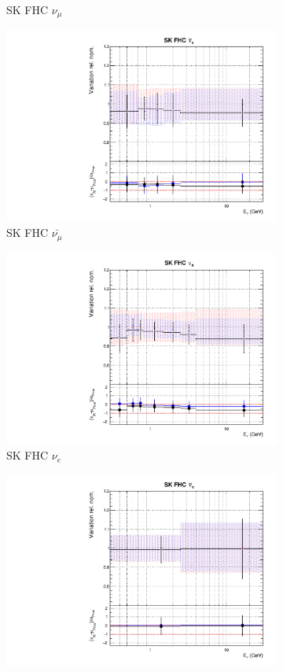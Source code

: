 \begin{figure}[t]
\begin{subfigure}{0.45\textwidth}
  \caption{SK FHC $\nu_{\mu}$}
\end{subfigure}
\begin{subfigure}{0.45\textwidth}
  \centering
  \includegraphics[width=0.75\linewidth]{figs/rhcmpasmvflux9}
  \caption{SK FHC $\bar{\nu_{\mu}}$}
\end{subfigure}
\begin{subfigure}{0.45\textwidth}
  \centering
  \includegraphics[width=0.75\linewidth]{figs/rhcmpasmvflux10}
  \caption{SK FHC $\nu_e$}
\end{subfigure}
\begin{subfigure}{0.45\textwidth}
  \centering
  \includegraphics[width=0.75\linewidth]{figs/rhcmpasmvflux11}

\end{subfigure}
\end{figure}
